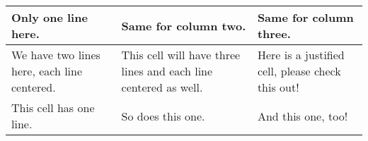 \begin{table}[H]
    \centering
    \begin{tabular}{>{\centering\arraybackslash}m{3.7cm}|>{\centering\arraybackslash}m{3.7cm}|>{\centering\arraybackslash}m{3.7cm}}
    \hline
    Only one line here. & Same for column two. & Same for column three. \\
    \hline
    We have two lines here, each line centered. & This cell will have three lines and each line centered as well. & Here is a justified cell, please check this out! \\
    \hline
    This cell has one line. & So does this one. & And this one, too! \\
    \hline
    \end{tabular}
\end{table}
